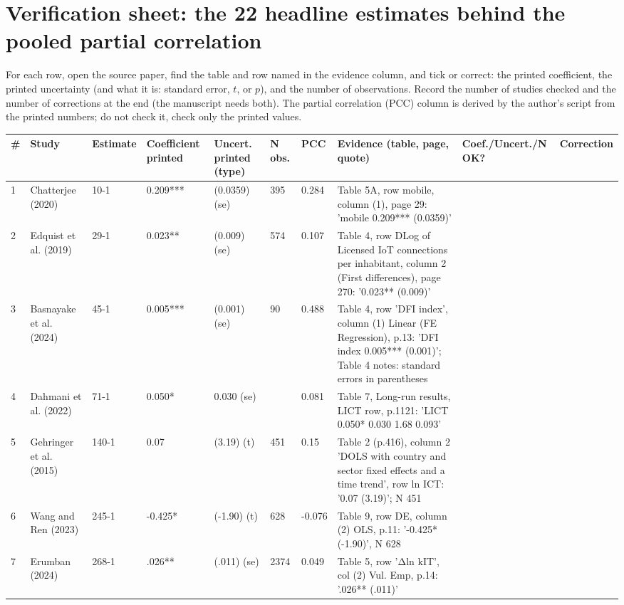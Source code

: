 \documentclass[10pt,a4paper]{article}
\begin{document}
\small
\section*{Verification sheet: the 22 headline estimates behind the pooled partial correlation}
For each row, open the source paper, find the table and row named in the evidence column, and tick or correct: the printed coefficient, the printed uncertainty (and what it is: standard error, $t$, or $p$), and the number of observations. Record the number of studies checked and the number of corrections at the end (the manuscript needs both). The partial correlation (PCC) column is derived by the author's script from the printed numbers; do not check it, check only the printed values.
\par\medskip\footnotesize
\begin{longtable}{@{}p{0.6cm}p{2.7cm}p{1.6cm}p{2.0cm}p{1.2cm}p{1.0cm}p{0.9cm}p{4.8cm}p{1.5cm}p{1.6cm}@{}}
\toprule \# & Study & Estimate & Coefficient printed & Uncert. printed (type) & N obs. & PCC & Evidence (table, page, quote) & Coef./Uncert./N OK? & Correction \\ \midrule \endhead
1 & Chatterjee (2020) & 10-1 & 0.209*** & (0.0359) (se) & 395 & 0.284 & Table 5A, row mobile, column (1), page 29: 'mobile 0.209*** (0.0359)' & & \\ \midrule
2 & Edquist et al. (2019) & 29-1 & 0.023** & (0.009) (se) & 574 & 0.107 & Table 4, row DLog of Licensed IoT connections per inhabitant, column 2 (First differences), page 270: '0.023** (0.009)' & & \\ \midrule
3 & Basnayake et al. (2024) & 45-1 & 0.005*** & (0.001) (se) & 90 & 0.488 & Table 4, row 'DFI index', column (1) Linear (FE Regression), p.13: 'DFI index 0.005*** (0.001)'; Table 4 notes: standard errors in parentheses & & \\ \midrule
4 & Dahmani et al. (2022) & 71-1 & 0.050* & 0.030 (se) &  & 0.081 & Table 7, Long-run results, LICT row, p.1121: 'LICT 0.050* 0.030 1.68 0.093' & & \\ \midrule
5 & Gehringer et al. (2015) & 140-1 & 0.07 & (3.19) (t) & 451 & 0.15 & Table 2 (p.416), column 2 'DOLS with country and sector fixed effects and a time trend', row ln ICT: '0.07 (3.19)'; N 451 & & \\ \midrule
6 & Wang and Ren (2023) & 245-1 & -0.425* & (-1.90) (t) & 628 & -0.076 & Table 9, row DE, column (2) OLS, p.11: '-0.425* (-1.90)', N 628 & & \\ \midrule
7 & Erumban (2024) & 268-1 & .026** & (.011) (se) & 2374 & 0.049 & Table 5, row 'Δln kIT', col (2) Vul. Emp, p.14: '.026** (.011)' & & \\ \midrule

\end{longtable}
\end{document}
